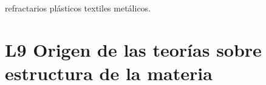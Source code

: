 \documentclass[12pt,addpoints]{repaso}
\begin{document}
\begin{questions}
{\begin{multicols}{2}
\begin{parts}
                    \begin{multicols}{2}
                    \begin{choices}
                         \choice  refractarios  \choice  plásticos  \choice  textiles  \choice  metálicos.
                    \end{choices}
               \end{multicols}
     \end{parts}
\end{multicols}
}



\section*{L9 Origen de las teorías sobre estructura de la materia}

\end{questions}
\end{document}
